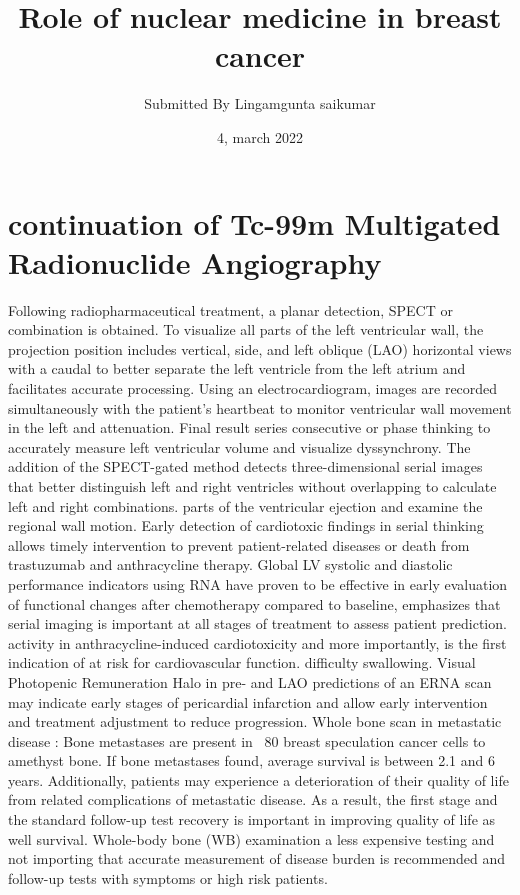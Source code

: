 \documentclass{article}
\title{Role of nuclear medicine in breast cancer}
\author{Submitted By Lingamgunta saikumar}
\date{4, march 2022}
\begin{document}
\maketitle

\section{ continuation of Tc-99m Multigated Radionuclide Angiography}
Following radiopharmaceutical treatment, a planar detection, SPECT or combination is obtained. To 
visualize all parts of the left ventricular wall, the projection position includes vertical, side, and left
oblique (LAO) horizontal views with a caudal to better separate the left ventricle from the left atrium 
and facilitates accurate processing. Using an electrocardiogram, images are recorded simultaneously 
with the patient's heartbeat to monitor ventricular wall movement in the left and attenuation. Final 
result series consecutive or phase thinking to accurately measure left ventricular volume and 
visualize dyssynchrony. The addition of the SPECT-gated method detects three-dimensional serial 
images that better distinguish left and right ventricles without overlapping to calculate left and right 
combinations. parts of the ventricular ejection and examine the regional wall motion. Early detection 
of cardiotoxic findings in serial thinking allows timely intervention to prevent patient-related diseases 
or death from trastuzumab and anthracycline therapy. Global LV systolic and diastolic performance 
indicators using RNA have proven to be effective in early evaluation of functional changes after 
chemotherapy compared to baseline, emphasizes that serial imaging is important at all stages of 
treatment to assess patient prediction. activity in anthracycline-induced cardiotoxicity and more 
importantly, is the first indication of at risk for cardiovascular function. difficulty swallowing. Visual 
Photopenic Remuneration Halo in pre- and LAO predictions of an ERNA scan may indicate early 
stages of pericardial infarction and allow early intervention and treatment adjustment to reduce 
progression. 
Whole bone scan in metastatic disease :
Bone metastases are present in ~80%
breast speculation cancer cells to amethyst bone. If bone metastases found, average survival 
is between 2.1 and 6 years. Additionally, patients may experience a deterioration of their 
quality of life from related complications of metastatic disease. As a result, the first stage 
and the standard follow-up test recovery is important in improving quality of life as well 
survival. Whole-body bone (WB) examination a less expensive testing and not importing that
accurate measurement of disease burden is recommended and follow-up tests with 
symptoms or high risk patients.
\end{document}
